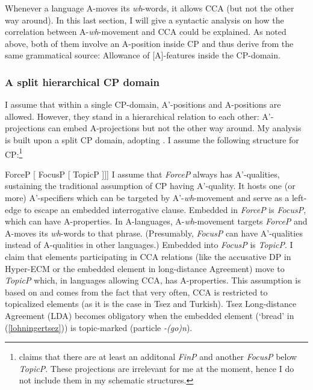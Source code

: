 \documentclass[output=paper,colorlinks,citecolor=brown]{langscibook}
\begin{document}
\ea Whenever a language A-moves its \textit{wh}-words, it allows CCA (but not the other way around).
\z
In this last section, I will give a syntactic analysis on how the correlation between A-\textit{wh}-movement and CCA could be explained. As noted above, both of them involve an A-position inside CP and thus derive from the same grammatical source: Allowance of [A]-features inside the CP-domain.

\subsubsection{A split hierarchical CP domain}
I assume that within a single CP-domain, A'-positions and A-positions are allowed. However, they stand in a hierarchical relation to each other: A'-projections can embed A-projections but not the other way around. My analysis is built upon a split CP domain, adopting \citet{rizzi1997fine}. I assume the following structure for CP:\footnote{\citet{rizzi1997fine} claims that there are at least an additonal \emph{FinP} and another \emph{FocusP} below \emph{TopicP}. These projections are irrelevant for me at the moment, hence I do not include them in my schematic structures.}

\ea {[} {ForceP} [ {FocusP} [ {TopicP} ]]]\z 
I assume that \emph{ForceP} always has A'-qualities, sustaining the traditional assumption of CP having A'-quality. It hosts one (or more) A'-specifiers which can be targeted by A'-\textit{wh}-movement and serve as a left-edge to escape an embedded interrogative clause. Embedded in \emph{ForceP} is \emph{FocusP}, which can have A-properties. In A-languages, A-\textit{wh}-movement targets \emph{ForceP} and A-moves its \textit{wh}-words to that phrase. (Presumably, \emph{FocusP} can have A'-qualities instead of A-qualities in other languages.) Embedded into \emph{FocusP} is \emph{TopicP}. I claim that elements participating in CCA relations (like the accusative DP in Hyper-ECM or the embedded element in long-distance Agreement) move to \emph{TopicP} which, in languages allowing CCA, has A-properties. This assumption is based on \citet{csener2008non} and comes from the fact that very often, CCA is restricted to topicalized elements (as it is the case in Tsez and Turkish). Tsez Long-distance Agreement (LDA) becomes obligatory when the embedded element (`bread' in (\ref{lohningertsez})) is topic-marked (particle \emph{-(go)n}).
\end{document}
